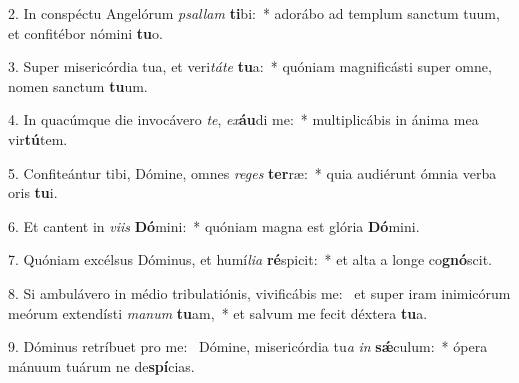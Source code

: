2. In conspéctu Angelórum \textit{psal}\textit{lam} \textbf{ti}bi:~*  adorábo ad templum sanctum tuum, et confitébor nómini \textbf{tu}o.\

3. Super misericórdia tua, et veri\textit{tá}\textit{te} \textbf{tu}a:~*  quóniam magnificásti super omne, nomen sanctum \textbf{tu}um.\

4. In quacúmque die invocávero \textit{te}, \textit{ex}\textbf{áu}di me:~*  multiplicábis in ánima mea vir\textbf{tú}tem.\

5. Confiteántur tibi, Dómine, omnes \textit{re}\textit{ges} \textbf{ter}ræ:~*  quia audiérunt ómnia verba oris \textbf{tu}i.\

6. Et cantent in \textit{vi}\textit{is} \textbf{Dó}mini:~*  quóniam magna est glória \textbf{Dó}mini.\

7. Quóniam excélsus Dóminus, et humí\textit{li}\textit{a} \textbf{ré}spicit:~*  et alta a longe co\textbf{gnó}scit.\

8. Si ambulávero in médio tribulatiónis, vivificábis me: \dag\  et super iram inimicórum meórum extendísti \textit{ma}\textit{num} \textbf{tu}am,~*  et salvum me fecit déxtera \textbf{tu}a.\

9. Dóminus retríbuet pro me: \dag\  Dómine, misericórdia tu\textit{a} \textit{in} \textbf{sǽ}culum:~*  ópera mánuum tuárum ne de\textbf{spí}cias.\

